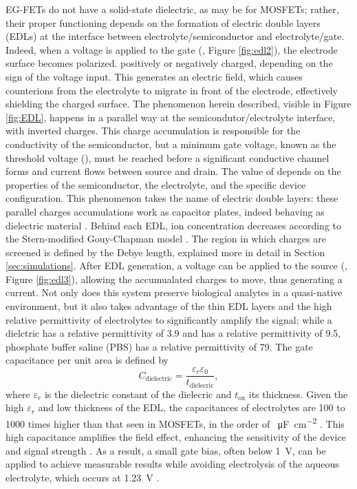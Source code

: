 EG-FETs do not have a solid-state dielectric, as  may be for MOSFETs;
rather, their proper functioning depends on the formation of electric double
layers (EDLs) at the interface between electrolyte/semiconductor and
electrolyte/gate. Indeed, when a voltage is applied to the gate (\vgs{}, Figure
\ref{fig:edl2}), the electrode surface becomes polarized.%
positively or negatively charged, depending on the sign of the voltage input. 
This generates an electric field, which causes counterions from the electrolyte
to migrate in front of the electrode, effectively shielding the charged surface.
The phenomenon herein described, visible in Figure \ref{fig:EDL}, happens in a
parallel way at the semicondutor/electrolyte interface, with inverted charges.
This charge accumulation is responsible for the conductivity of the
semiconductor, but a minimum gate voltage, known as the threshold voltage
(\vth{}), must be reached before a significant conductive channel forms and
current flows between source and drain. The value of \vth{} depends on the
properties of the semiconductor, the electrolyte, and the specific device
configuration. This phenomenon takes the name of electric double layers: these
parallel charges accumulations work as capacitor plates, indeed behaving as
dielectric material \citep{kimElectrolyteGated2013, wangElectrolytic2016}.
Behind each EDL, ion concentration decreases according to the Stern-modified
Gouy-Chapman model \citep{oldhamGouy2008}. The region in which charges are
screened is defined by the Debye length, explained more in detail in Section
\ref{sec:simulations}. After EDL generation, a voltage can be applied to the
source (\vds{}, Figure \ref{fig:edl3}), allowing the accumualated charges to
move, thus generating a current. Not only does this system preserve biological
analytes in a quasi-native environment, but it also takes advantage of the thin
EDL layers and the high relative permittivity of electrolytes to significantly
amplify the signal; while a  dielctric has a relative permittivity of
3.9 and  has a relative permittivity of 9.5, phosphate buffer saline
(PBS) has a relative permittivity of 79. The gate capacitance per unit area is
defined by
\begin{equation}
C_{\text{dielectric}} = \frac{\varepsilon_r \varepsilon_0}{t_{\text{dielecric}}},
\end{equation}
where $\varepsilon_r$ is the dielectric constant of the dielecric and $t_{\text{ox}}$ its thickness. Given the high $\varepsilon_r$ and low thickness of the EDL, the capacitances of electrolytes are 100 to 1000 times higher than that seen in MOSFETs, in the order of \SI{}{\micro F\per\cm\squared} \citep{shkodraElectrolytegated2021,velickyElectrolyte2021}. This high capacitance amplifies the field effect, enhancing the sensitivity of the device and signal strength \citep{shkodraElectrolytegated2021}. As a result, a small gate bias, often below \SI{1}{V}, can be applied to achieve measurable results while avoiding electrolysis of the aqueous electrolyte, which occurs at \SI{1.23}{V} \citep{suoWaterinsalt2015}.

